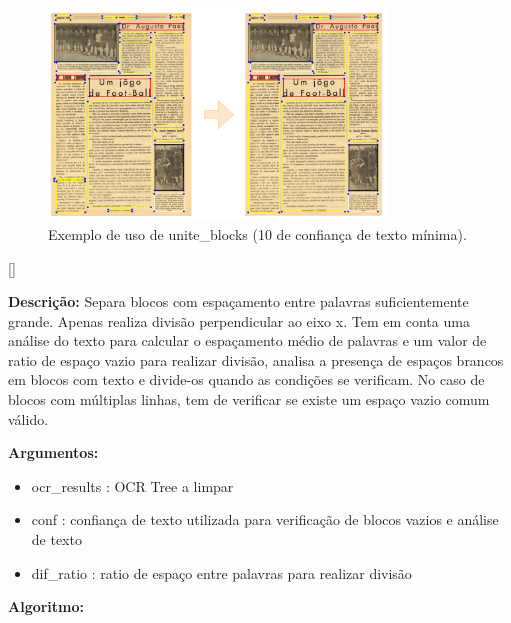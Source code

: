 \begin{figure}[H]
	\centering
	\includegraphics[width=0.8\textwidth]{images/ilustracoes/unite_blocks.png}
	\caption{Exemplo de uso de unite\_blocks (10 de confiança de texto mínima).}
	\label{fig:unite_blocks}
\end{figure}


[\normalsize]

\textbf{Descrição:} Separa blocos com espaçamento entre palavras suficientemente grande. Apenas realiza divisão perpendicular ao eixo x. Tem em conta uma análise do texto para calcular o espaçamento médio de palavras e um valor de ratio de espaço vazio para realizar divisão, analisa a presença de espaços brancos em blocos com texto e divide-os quando as condições se verificam. No caso de blocos com múltiplas linhas, tem de verificar se existe um espaço vazio comum válido.

\textbf{Argumentos:}
\begin{itemize}\setlength\itemsep{-0.3em}
	\vspace{-0.5em}
	\item ocr\_results : OCR Tree a limpar
	\item conf : confiança de texto utilizada para verificação de blocos vazios e análise de texto
	\item dif\_ratio : ratio de espaço entre palavras para realizar divisão
\end{itemize}

\textbf{Algoritmo:}

